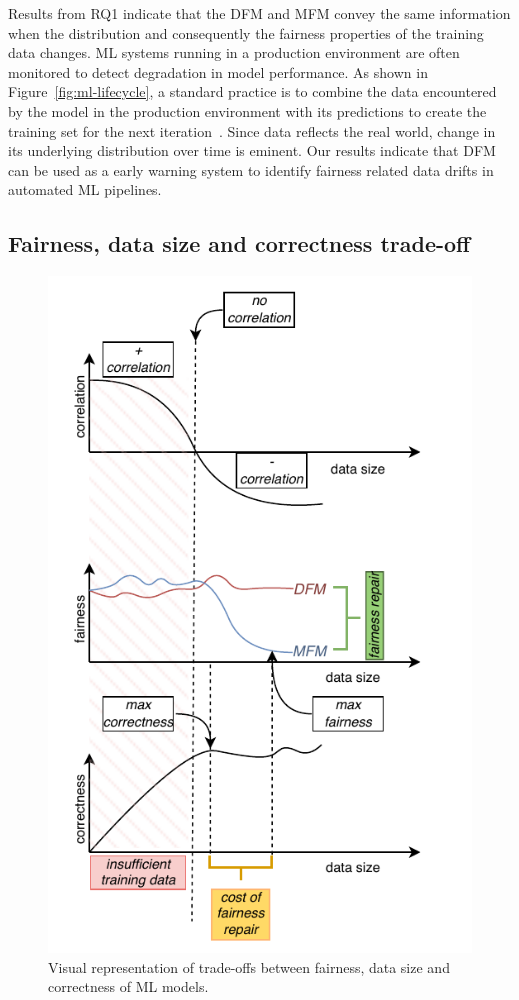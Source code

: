 \documentclass[conference]{IEEEtran}
\begin{document}
Results from RQ1 indicate that the DFM and MFM convey the same
information when the distribution and consequently the fairness
properties of the training data changes. ML systems running in a
production environment are often monitored to detect degradation in
model performance. As shown in Figure \ref{fig:ml-lifecycle}, a
standard practice is to combine the data encountered by the model in
the production environment with its predictions to create the training
set for the next iteration \cite{biessmann2021automated}. Since data
reflects the real world, change in its underlying distribution over
time is eminent. Our results indicate that DFM can be used as a early
warning system to identify fairness related data drifts in automated
ML pipelines.

\subsection{Fairness, data size and correctness trade-off}\label{sec:discuss-fair-eff-perf-trade}

\begin{figure}
  \centering
  \includegraphics[width=\linewidth]{tradeoff.pdf}
  \caption{Visual representation of trade-offs between fairness, data
    size and correctness of ML models.}
  \label{fig:tradeoff}
\end{figure}
\end{document}
